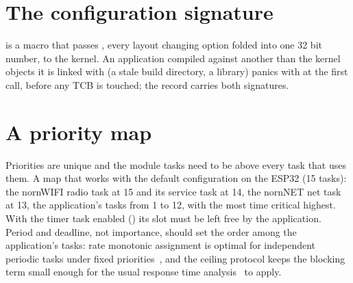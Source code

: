 \section{The configuration signature}

 is a macro that passes , every layout
changing option folded into one 32 bit number, to the kernel. An application compiled
against another  than the kernel objects it is linked with (a stale
build directory, a library) panics with  at the first call,
before any TCB is touched; the record carries both signatures.

\section{A priority map}

Priorities are unique and the module tasks need to be above every task that uses them.
A map that works with the default configuration on the ESP32 (15 tasks): the nornWIFI
radio task at 15 and its service task at 14, the nornNET net task at 13, the
application's tasks from 1 to 12, with the most time critical highest. With the timer
task enabled () its slot must be left free by the application.
Period and deadline, not importance, should set the order among the application's
tasks: rate monotonic assignment is optimal for independent periodic tasks under fixed
priorities~\cite{liulayland}, and the ceiling protocol keeps the blocking term small
enough for the usual response time analysis~\cite{burnswellings} to apply.
